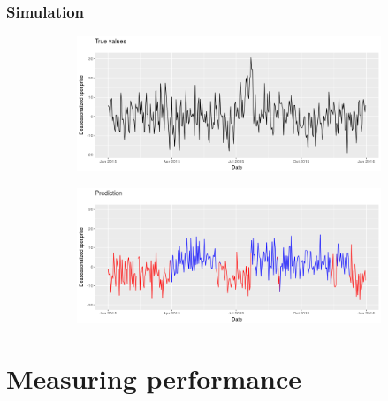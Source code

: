 \documentclass{beamer}
\begin{document}
\begin{frame}
\frametitle{Simulation}

\begin{figure}
\centering
   \begin{subfigure}[b]{0.7\textwidth}
   \includegraphics[width=1\linewidth]{true.png}
   \label{fig:Ng1} 
\end{subfigure}

\begin{subfigure}[b]{0.7\textwidth}
   \includegraphics[width=1\linewidth]{prediction.png}
   \label{fig:Ng2}
\end{subfigure}

\end{figure}
\end{frame}


\section{Measuring performance}
\end{document}

